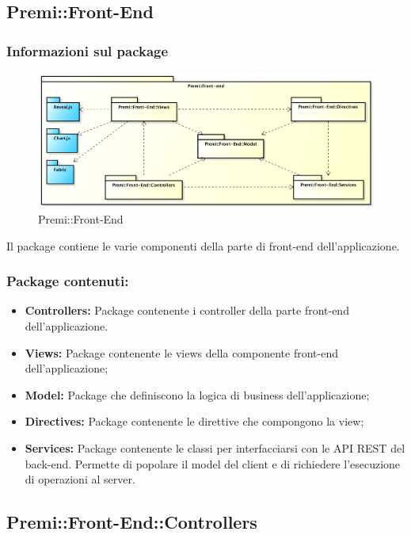 \subsection{Premi::Front-End}
	\subsubsection*{Informazioni sul package}
		\begin{figure}[h]
			\centering
			\includegraphics[width=\linewidth]{img/front-end}
			\caption[Premi::Front-End]{Premi::Front-End}
		\end{figure}
		Il package contiene le varie componenti della parte di \gls{front-end} dell'applicazione.

		\subsubsection*{Package contenuti:}
			\begin{itemize}
				\item \textbf{Controllers:} Package contenente i controller della parte \gls{front-end} dell'applicazione.
				\item \textbf{Views:} Package contenente le views della componente \gls{front-end} dell'applicazione;
				\item \textbf{Model:} Package che definiscono la logica di business dell'applicazione;
				\item \textbf{Directives:} Package contenente le direttive che compongono la view;
				\item \textbf{Services:} Package contenente le classi per interfacciarsi con le API REST del \gls{back-end}. Permette di popolare il model del client e di richiedere l'esecuzione di operazioni al server.
			\end{itemize}

		\subsection{Premi::Front-End::Controllers}
			
			\newpage

